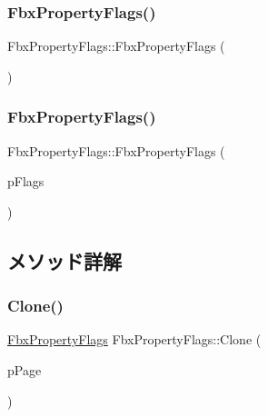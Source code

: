 \subsubsection{\texorpdfstring{Fbx\+Property\+Flags()}{FbxPropertyFlags()}\hspace{0.1cm}{\footnotesize\ttfamily [1/2]}}
{\footnotesize\ttfamily Fbx\+Property\+Flags\+::\+Fbx\+Property\+Flags (\begin{DoxyParamCaption}{ }\end{DoxyParamCaption})}

\mbox{\label{class_fbx_property_flags_a02b8c774de77a0cbd3482f11367c2f0c}} 
\subsubsection{\texorpdfstring{Fbx\+Property\+Flags()}{FbxPropertyFlags()}\hspace{0.1cm}{\footnotesize\ttfamily [2/2]}}
{\footnotesize\ttfamily Fbx\+Property\+Flags\+::\+Fbx\+Property\+Flags (\begin{DoxyParamCaption}\item[{\hyperlink{class_fbx_property_flags_afabfa7e0949aac8a7dcdf8a141867e99}{Fbx\+Property\+Flags\+::\+E\+Flags}}]{p\+Flags }\end{DoxyParamCaption})\hspace{0.3cm}{\ttfamily [explicit]}}



\subsection{メソッド詳解}
\mbox{\label{class_fbx_property_flags_ac928577504324520a056da2f3cf7d340}} 
\subsubsection{\texorpdfstring{Clone()}{Clone()}}
{\footnotesize\ttfamily \hyperlink{class_fbx_property_flags}{Fbx\+Property\+Flags} Fbx\+Property\+Flags\+::\+Clone (\begin{DoxyParamCaption}\item[{\hyperlink{class_fbx_property_page}{Fbx\+Property\+Page} $\ast$}]{p\+Page }\end{DoxyParamCaption})}

